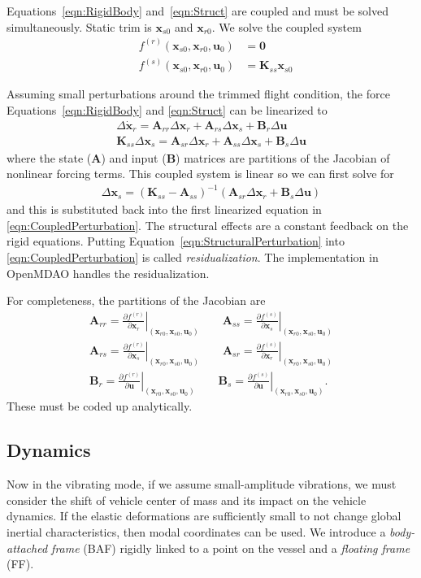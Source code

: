 \documentclass[10pt]{article}
\newcommand{\pp}[2]{\frac{\partial #1}{\partial #2}}
\newcommand{\mbf}[1]{\mathbf{#1}}
\newcommand{\be}{\begin{eqnarray}}
\newcommand{\ee}{\end{eqnarray}}
\newcommand{\beq}{\begin{equation}\begin{aligned}}
\newcommand{\eeq}{\end{aligned}\end{equation}}
\begin{document}
Equations~\eqref{eqn:RigidBody} and~\eqref{eqn:Struct} are coupled and must be solved simultaneously.
Static trim is $\mbf{x}_{s0}$ and $\mbf{x}_{r0}$.
We solve the coupled system
\beq
& f^{(r)}\left( \mbf{x}_{s0}, \mbf{x}_{r0}, \mbf{u}_{0} \right) & = \mbf{0}
\\
& f^{(s)}\left( \mbf{x}_{s0}, \mbf{x}_{r0}, \mbf{u}_{0} \right)
&=
\mbf{K}_{ss} \mbf{x}_{s0}
\eeq

Assuming small perturbations around the trimmed flight condition, the force Equations~\eqref{eqn:RigidBody} and \eqref{eqn:Struct} can be linearized to
% 
\beq
\label{eqn:CoupledPerturbation}
\Delta \dot{\mbf{x}}_r = \mbf{A}_{rr} \Delta \mbf{x}_r
+ \mbf{A}_{rs} \Delta \mbf{x}_s
+ \mbf{B}_{r} \Delta \mbf{u}
\\
\mbf{K}_{ss} \Delta {\mbf{x}}_s =
\mbf{A}_{sr} \Delta \mbf{x}_r
+ \mbf{A}_{ss} \Delta \mbf{x}_s
+ \mbf{B}_{s} \Delta \mbf{u}
\eeq
% 
where the state ($\mbf{A}$) and input ($\mbf{B}$) matrices are partitions of the Jacobian of nonlinear forcing terms.
This coupled system is linear so we can first solve for
\be
\label{eqn:StructuralPerturbation}
\Delta \mbf{x}_s = \left(\mbf{K}_{ss} - \mbf{A}_{ss}\right)^{-1} \left(\mbf{A}_{sr} \Delta \mbf{x}_r + \mbf{B}_s \Delta \mbf{u} \right)
\ee
and this is substituted back into the first linearized equation in \eqref{eqn:CoupledPerturbation}.
The structural effects are a constant feedback on the rigid equations.
Putting Equation~\eqref{eqn:StructuralPerturbation} into \eqref{eqn:CoupledPerturbation} is called \emph{residualization}.
The implementation in OpenMDAO handles the residualization.

For completeness, the partitions of the Jacobian are
\beq
\mbf{A}_{rr} = \left. \pp{f^{(r)}}{\mbf{x}_r} \right|_{(\mbf{x}_{r0}, \mbf{x}_{s0}, \mbf{u}_0)}
\qquad
\mbf{A}_{ss} = \left. \pp{f^{(s)}}{\mbf{x}_s} \right|_{(\mbf{x}_{r0}, \mbf{x}_{s0}, \mbf{u}_0)}
\\
\mbf{A}_{rs} = \left. \pp{f^{(r)}}{\mbf{x}_s} \right|_{(\mbf{x}_{r0}, \mbf{x}_{s0}, \mbf{u}_0)}
\qquad
\mbf{A}_{sr} = \left. \pp{f^{(s)}}{\mbf{x}_r} \right|_{(\mbf{x}_{r0}, \mbf{x}_{s0}, \mbf{u}_0)}
\\
\mbf{B}_{r} = \left. \pp{f^{(r)}}{\mbf{u}} \right|_{(\mbf{x}_{r0}, \mbf{x}_{s0}, \mbf{u}_0)}
\qquad
\mbf{B}_{s} = \left. \pp{f^{(s)}}{\mbf{u}} \right|_{(\mbf{x}_{r0}, \mbf{x}_{s0}, \mbf{u}_0)}.
\eeq
These must be coded up analytically.

\subsection{Dynamics}
Now in the vibrating mode, if we assume small-amplitude vibrations, we must consider the shift of vehicle center of mass and its impact on the vehicle dynamics.
If the elastic deformations are sufficiently small to not change global inertial characteristics, then modal coordinates can be used.
We introduce a \emph{body-attached frame} (BAF) rigidly linked to a point on the vessel and a \emph{floating frame} (FF).
\end{document}
